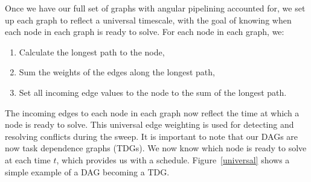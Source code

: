 Once we have our full set of graphs with angular pipelining accounted for, we set up each graph to reflect a universal timescale, with the goal of knowing when each node in each graph is ready to solve.
For each node in each graph, we:
\begin{enumerate}
  \item Calculate the longest path to the node,
  \item Sum the weights of the edges along the longest path,
  \item Set all incoming edge values to the node to the sum of the longest path.
\end{enumerate}
The incoming edges to each node in each graph now reflect the time at which a node is ready to solve. This universal edge weighting is used for detecting and resolving conflicts during the sweep. It is important to note that our DAGs are now task dependence graphs (TDGs). We now know which node is ready to solve at each time $t$, which provides us with a schedule. Figure~\ref{universal} shows a simple example of a DAG becoming a TDG.
